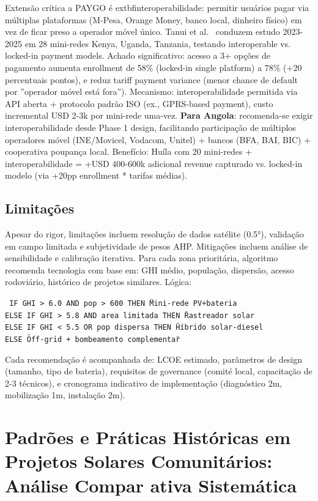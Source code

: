 \documentclass[12pt, a4paper]{article}
\begin{document}
Extensão crítica a PAYGO é 	extbf{interoperabilidade}: permitir usuários pagar via múltiplas plataformas (M-Pesa, Orange Money, banco local, dinheiro físico) em vez de ficar preso a operador móvel único. Tanui et al.~\citep{Tanui2024} conduzem estudo 2023-2025 em 28 mini-redes Kenya, Uganda, Tanzania, testando interoperable vs. locked-in payment models. Achado significativo: acesso a 3+ opções de pagamento aumenta enrollment de 58\% (locked-in single platform) a 78\% (+20 percentuais pontos), e reduz tariff payment variance (menor chance de default por ''operador móvel está fora''). Mecanismo: interoperabilidade permitida via API aberta + protocolo padrão ISO (ex., GPRS-based payment), custo incremental USD 2-3k por mini-rede uma-vez. \textbf{Para Angola}: recomenda-se exigir interoperabilidade desde Phase 1 design, facilitando participação de múltiplos operadores móvel (INE/Movicel, Vodacom, Unitel) + bancos (BFA, BAI, BIC) + cooperativa poupança local. Benefício: Huíla com 20 mini-redes + interoperabilidade = +USD 400-600k adicional revenue capturado vs. locked-in modelo (via +20pp enrollment * tarifas médias).

\subsection{Limitações}

Apesar do rigor, limitações incluem resolução de dados satélite (0.5°), validação em campo limitada e subjetividade de pesos AHP. Mitigações incluem análise de sensibilidade e calibração iterativa.
Para cada zona prioritária, algoritmo recomenda tecnologia com base em: GHI médio, população, dispersão, acesso rodoviário, histórico de projetos similares. Lógica:

\texttt{
IF GHI > 6.0 AND pop > 600 THEN \"Mini-rede PV+bateria\" \\
ELSE IF GHI > 5.8 AND area limitada THEN \"Rastreador solar\" \\
ELSE IF GHI < 5.5 OR pop dispersa THEN \"Híbrido solar-diesel\" \\
ELSE \"Off-grid + bombeamento complementar\"
}

Cada recomendação é acompanhada de: LCOE estimado, parâmetros de design (tamanho, tipo de bateria), requisitos de governance (comité local, capacitação de 2-3 técnicos), e cronograma indicativo de implementação (diagnóstico 2m, mobilização 1m, instalação 2m).\n
\section{Padrões e Práticas Históricas em Projetos Solares Comunitários: Análise Compar ativa Sistemática}
\end{document}
